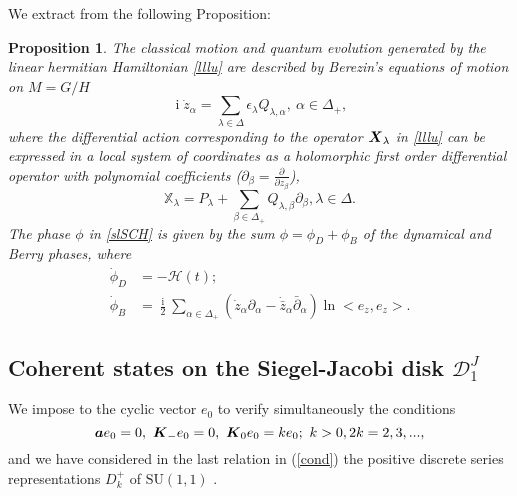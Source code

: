 \documentclass[12pt]{amsart}
\numberwithin{equation}{section}
\newtheorem{Proposition}{Proposition}
\theoremstyle{definition}
\begin{document}
We extract from  \cite{sbcag,sbl,nou}  the following Proposition: 
\begin{Proposition}\label{propvechi}
The  classical motion and quantum evolution  generated
by the linear hermitian  Hamiltonian  \eqref{lllu}  are described
by Berezin's   equations
of motion  on $M=G/H$
\begin{equation}\label{moveM}
{{\operatorname{i}}\dot{z}_{\alpha}=\sum_{\lambda\in\Delta}\epsilon_{\lambda}Q_{\lambda
,\alpha}},~\alpha\in\Delta_+ , 
\end{equation}
where the differential action corresponding to the operator
${{\mbox{\boldmath{${X}$}}}}_{\lambda}$ in \eqref{lllu} can be expressed in a local
system of coordinates as a holomorphic  first order differential
operator with polynomial coefficients  (${\partial}_{\beta}=\frac{\partial}{{\partial}
  z_{\beta}}$),
\begin{equation}\label{VBC}{{\mathbb{{X}}}}_{\lambda}=P_{\lambda}+\sum_{\beta\in\Delta_+}Q_{\lambda,
    \beta}\partial_{\beta}, \lambda\in\Delta.
\end{equation}
The phase $\phi$ in \eqref{slSCH} is given by the sum
$\phi=\phi_D+\phi_B$
of the dynamical and Berry phases, where
\begin{subequations}
\begin{align}
\dot{\phi}_D & = -{{\mathcal{{H}}}}(t); \\
\dot{\phi}_B & = \frac{\operatorname{i}}{2}\sum_{\alpha\in\Delta_+}(\dot{z}_{\alpha}{\partial}_{\alpha}-
 \dot{\bar{z}}_{\alpha}\bar{\partial}_{\alpha})\ln <e_z,e_z>. 
\end{align}
\end{subequations}
\end{Proposition}

\subsection{Coherent states on the  Siegel-Jacobi disk ${{\mathcal{{D}}}}^J_1$}\label{app33}

 We impose to the cyclic vector $e_0$ to verify simultaneously
 the conditions \cite{jac1}
\begin{equation}\label{cond}
{{\mbox{\boldmath{${a}$}}}}e_0  =  0, ~
 {{{\mbox{\boldmath{${K}$}}}}}_-e_0  =  0,~
{{{\mbox{\boldmath{${K}$}}}}}_0e_0  =  k e_0;~ k>0, 2k=2,3,... , 
\end{equation}
and we have considered in  the last relation in (\ref{cond}) the positive  discrete series
representations $D^+_k$ of $\text{SU}(1,1)$  \cite{bar47}.
\end{document}
